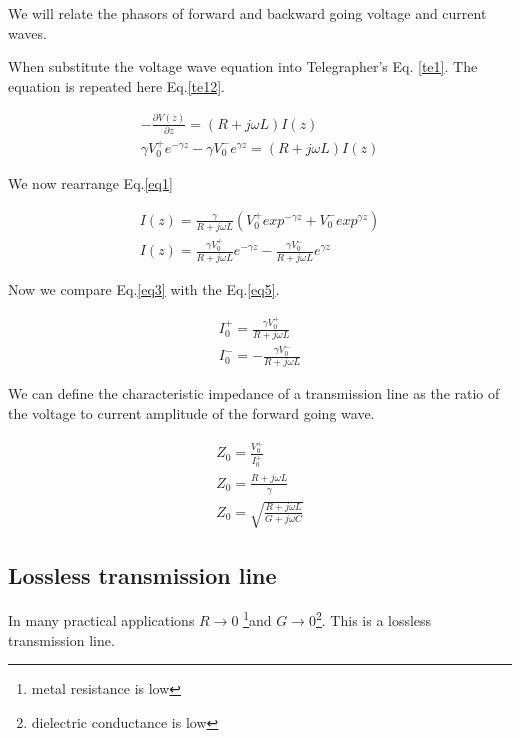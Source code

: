 We will relate the phasors of forward and backward going voltage and
current waves.

When substitute the voltage wave equation into Telegrapher's  Eq.
\ref{te1}. The equation is repeated here  Eq.\ref{te12}.




\begin{eqnarray}
-\frac{\partial V(z)}{\partial z} = (R+j\omega L) I(z) \label{te12} \\
\gamma V_0^+ e^{-\gamma z} - \gamma V_0^- e^{\gamma z} = (R+ j \omega
L) I(z) \label{eq1}
\end{eqnarray}

We now rearrange Eq.\ref{eq1}

\begin{eqnarray}
I(z)=\frac{\gamma}{R+j\omega L} ( V_0^+ exp^{-\gamma z} + V_0^-
 exp^{\gamma z})  \nonumber  \\
I(z)=\frac{\gamma V_0^+}{R+ j \omega L} e^{-\gamma z} - \frac{\gamma V_0^-}{R+ j \omega L} e^{\gamma z} \label{eq3}
\end{eqnarray}

Now we compare Eq.\ref{eq3} with the Eq.\ref{eq5}.

\begin{eqnarray}
I_0^+=\frac{\gamma V_0^+}{R+ j \omega L} \nonumber  \\
I_0^-= - \frac{\gamma V_0^-}{R+ j \omega L} \nonumber
\end{eqnarray}

We can define the characteristic impedance of a transmission line as
the ratio of the voltage to current amplitude of the forward going
wave.


\begin{eqnarray}
Z_0=\frac{V_0^+}{ I_0^+} \nonumber   \\ \nonumber
Z_0=\frac{R+j\omega L}{\gamma} \nonumber   \\ \nonumber
Z_0=\sqrt{\frac{R+j\omega L}{G+ j\omega C}}
\end{eqnarray}


\subsection{Lossless transmission line}


In many practical applications $R\to 0$ \footnote{metal resistance is
low}and $G \to 0$\footnote{dielectric conductance is low}. This is a
lossless transmission line.

